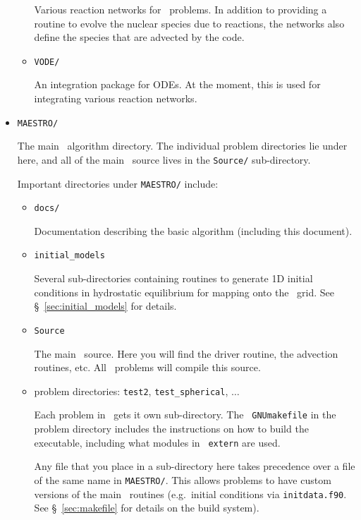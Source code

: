 \begin{itemize}
\begin{itemize}
    Various reaction networks for \maestro\ problems.  In addition to
    providing a routine to evolve the nuclear species due to
    reactions, the networks also define the species that are advected
    by the code.

  \item {\tt VODE/}

    An integration package for ODEs.  At the moment, this is used for
    integrating various reaction networks.
 
  \end{itemize}

\item {\tt MAESTRO/}

  The main \maestro\ algorithm directory.  The individual problem
  directories lie under here, and all of the main \maestro\ source
  lives in the {\tt Source/} sub-directory.

  Important directories under {\tt MAESTRO/} include:

  \begin{itemize}

  \item {\tt docs/}

    Documentation describing the basic algorithm (including this
    document).

  \item {\tt initial\_models}

    Several sub-directories containing routines to generate 1D initial
    conditions in hydrostatic equilibrium for mapping onto the
    \maestro\ grid.  See \S~\ref{sec:initial_models} for details.

  \item {\tt Source}

    The main \maestro\ source.  Here you will find the driver routine,
    the advection routines, etc.  All \maestro\ problems will compile
    this source.

  \item problem directories: {\tt test2}, {\tt test\_spherical},
    $\ldots$

    Each problem in \maestro\ gets it own sub-directory.  The {\tt
      GNUmakefile} in the problem directory includes the instructions
    on how to build the executable, including what modules in {\tt
      extern} are used.

    Any file that you place in a sub-directory here takes precedence
    over a file of the same name in {\tt MAESTRO/}.  This allows
    problems to have custom versions of the main \maestro\ routines
    (e.g.\ initial conditions via {\tt initdata.f90}.  See
    \S~\ref{sec:makefile} for details on the build system).

  \end{itemize}

\end{itemize}


